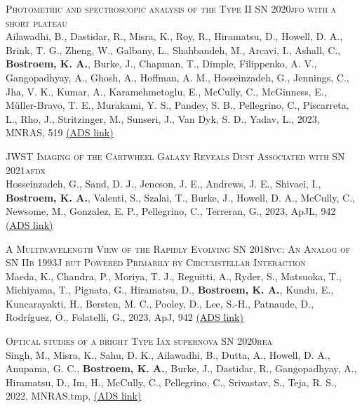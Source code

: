\begin{revnumerate}[67]
    \item{\textsc{Photometric and spectroscopic analysis of the Type II SN 2020jfo with a short plateau}\\ 
    Ailawadhi, B., Dastidar, R., Misra, K., Roy, R., Hiramatsu, D., Howell, D. A., Brink, T. G., Zheng, W., Galbany, L., Shahbandeh, M., Arcavi, I., Ashall, C., \textbf{Bostroem, K. A.}, Burke, J., Chapman, T., Dimple, Filippenko, A. V., Gangopadhyay, A., Ghosh, A., Hoffman, A. M., Hosseinzadeh, G., Jennings, C., Jha, V. K., Kumar, A., Karamehmetoglu, E., McCully, C., McGinness, E., Müller-Bravo, T. E., Murakami, Y. S., Pandey, S. B., Pellegrino, C., Piscarreta, L., Rho, J., Stritzinger, M., Sunseri, J., Van Dyk, S. D., Yadav, L., 2023, MNRAS, 519 
    \color{blue}\href{https://ui.adsabs.harvard.edu/abs/2023MNRAS.519..248A}{(ADS link)}\color{black}}\\

\item{\textsc{JWST Imaging of the Cartwheel Galaxy Reveals Dust Associated with SN 2021afdx}\\ 
Hosseinzadeh, G., Sand, D. J., Jencson, J. E., Andrews, J. E., Shivaei, I., \textbf{Bostroem, K. A.}, Valenti, S., Szalai, T., Burke, J., Howell, D. A., McCully, C., Newsome, M., Gonzalez, E. P., Pellegrino, C., Terreran, G., 2023, ApJL, 942 
\color{blue}\href{https://ui.adsabs.harvard.edu/abs/2023ApJ...942L..18H}{(ADS link)}\color{black}}\\
    
    \item{\textsc{A Multiwavelength View of the Rapidly Evolving SN 2018ivc: An Analog of SN IIb 1993J but Powered Primarily by Circumstellar Interaction}\\ 
    Maeda, K., Chandra, P., Moriya, T. J., Reguitti, A., Ryder, S., Matsuoka, T., Michiyama, T., Pignata, G., Hiramatsu, D., \textbf{Bostroem, K. A.}, Kundu, E., Kuncarayakti, H., Bersten, M. C., Pooley, D., Lee, S.-H., Patnaude, D., Rodríguez, Ó., Folatelli, G., 2023, ApJ, 942 
    \color{blue}\href{https://ui.adsabs.harvard.edu/abs/2023ApJ...942...17M}{(ADS link)}\color{black}}\\

    \item{\textsc{Optical studies of a bright Type Iax supernova SN 2020rea}\\ 
    Singh, M., Misra, K., Sahu, D. K., Ailawadhi, B., Dutta, A., Howell, D. A., Anupama, G. C., \textbf{Bostroem, K. A.}, Burke, J., Dastidar, R., Gangopadhyay, A., Hiramatsu, D., Im, H., McCully, C., Pellegrino, C., Srivastav, S., Teja, R. S., 2022, MNRAS.tmp, 
    \color{blue}\href{https://ui.adsabs.harvard.edu/abs/2022MNRAS.tmp.2872S}{(ADS link)}\color{black}}\\
    

\end{revnumerate}
